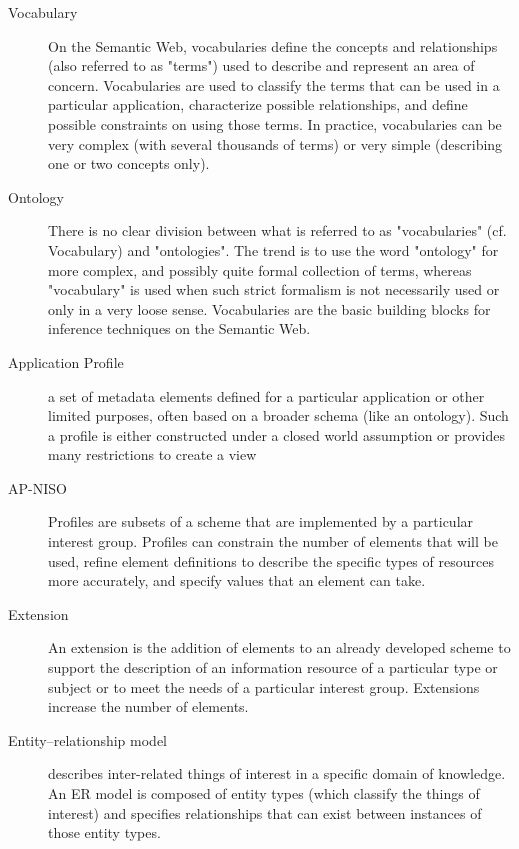 \documentclass[a4paper,english,twoside,BCOR1.5cm,headsepline,DIV12,appendixprefix,final,12pt]{scrbook}
\begin{document}
\begin{description}
\item[Vocabulary] On the Semantic Web, vocabularies define the concepts and relationships (also referred to as "terms") used to describe and represent an area of concern. Vocabularies are used to classify the terms that can be used in a particular application, characterize possible relationships, and define possible constraints on using those terms. In practice, vocabularies can be very complex (with several thousands of terms) or very simple (describing one or two concepts only)\cite{W3CVOCONTO}.

\item[Ontology] There is no clear division between what is referred to as "vocabularies" (cf. Vocabulary) and "ontologies". The trend is to use the word "ontology" for more complex, and possibly quite formal collection of terms, whereas "vocabulary" is used when such strict formalism is not necessarily used or only in a very loose sense. Vocabularies are the basic building blocks for inference techniques on the Semantic Web\cite{W3CVOCONTO}.

\item[Application Profile] a set of metadata elements defined for a particular application or other limited purposes, often based on a broader schema (like an ontology). Such a profile is either constructed under a closed world assumption or provides many restrictions to create a view 

\item[AP-NISO]Profiles are subsets of a scheme
that are implemented by a particular
interest group. Profiles can
constrain the number of elements
that will be used, refine element
definitions to describe the specific
types of resources more accurately,
and specify values that an element
can take.

\item[Extension] An extension is the
addition of elements to an
already developed
scheme to support the
description of an information
resource of a
particular type or subject
or to meet the needs of a
particular interest group.
Extensions increase the
number of elements.

\item[Entity–relationship model] describes inter-related things of interest in a specific domain of knowledge. An ER model is composed of entity types (which classify the things of interest) and specifies relationships that can exist between instances of those entity types.
\end{description}
\end{document}
